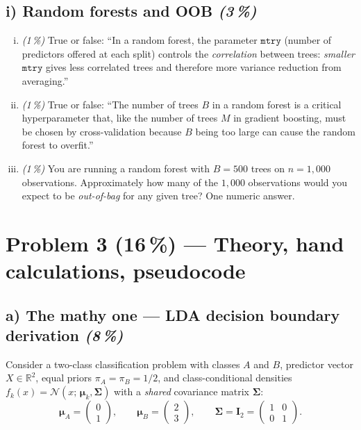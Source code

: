 \documentclass[11pt,a4paper]{article}
\newcommand{\points}[1]{\textbf{(#1\,\%)}}
\newcommand{\subpoints}[1]{\textit{(#1\,\%)}}
\begin{document}
\subsection*{i) Random forests and OOB \subpoints{3}}

\begin{enumerate}[(i)]
  \item \subpoints{1} True or false: ``In a random forest, the parameter $\mathtt{mtry}$ (number of predictors offered at each split) controls the \emph{correlation} between trees: \emph{smaller} $\mathtt{mtry}$ gives less correlated trees and therefore more variance reduction from averaging.''
  \item \subpoints{1} True or false: ``The number of trees $B$ in a random forest is a critical hyperparameter that, like the number of trees $M$ in gradient boosting, must be chosen by cross-validation because $B$ being too large can cause the random forest to overfit.''
  \item \subpoints{1} You are running a random forest with $B = 500$ trees on $n = 1{,}000$ observations. Approximately how many of the $1{,}000$ observations would you expect to be \emph{out-of-bag} for any given tree? One numeric answer.
\end{enumerate}

\vfill\eject

\section*{Problem 3 \points{16} --- Theory, hand calculations, pseudocode}

\subsection*{a) The mathy one --- LDA decision boundary derivation \subpoints{8}}

Consider a two-class classification problem with classes $A$ and $B$, predictor vector $X \in \mathbb{R}^2$, equal priors $\pi_A = \pi_B = 1/2$, and class-conditional densities $f_k(x) = \mathcal N(x;\,\bm\mu_k, \bm\Sigma)$ with a \emph{shared} covariance matrix $\bm\Sigma$:
$$\bm\mu_A = \begin{pmatrix} 0 \\ 1 \end{pmatrix}, \qquad \bm\mu_B = \begin{pmatrix} 2 \\ 3 \end{pmatrix}, \qquad \bm\Sigma = \mathbf{I}_2 = \begin{pmatrix} 1 & 0 \\ 0 & 1 \end{pmatrix}.$$
\end{document}
